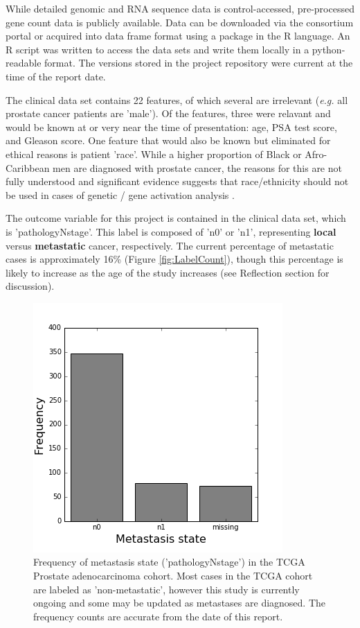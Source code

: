 \documentclass[final]{article}
\begin{document}
While detailed genomic and RNA sequence data is control-accessed, pre-processed
gene count data is publicly available.  Data can be downloaded via the
consortium  portal or acquired into data frame format using a package in the R
language.  An R script was written to access the data sets and write them locally
in a python-readable format.  The versions stored in the project repository were current at
the time of the report date.

The clinical data set contains 22 features, of which several are irrelevant
(\textit{e.g.} all prostate cancer patients are 'male').  Of the features, three were relavant and would be
known at or very near the time of presentation: age, PSA test score, and Gleason
score.  One feature that would also be known but eliminated for ethical reasons is
patient 'race'.  While a higher proportion of Black or Afro-Caribbean men are
diagnosed with prostate cancer, the reasons for this are not fully understood \cite{Shea08} and significant evidence suggests that
race/ethnicity should not be used in cases of genetic / gene activation analysis \cite{Yudel16}.

The outcome variable for this project is contained in the clinical data set,
which is 'pathologyNstage'.  This label is composed of 'n0' or 'n1',
representing \textbf{local} versus \textbf{metastatic} cancer, respectively.  The current
percentage of metastatic cases is approximately 16\% (Figure \ref{fig:LabelCount}), though this percentage is
likely to increase as the age of the study increases (see Reflection section for
discussion).

\begin{figure}
	\centering
	\includegraphics[scale=0.5]{LabelCount}
  \caption{Frequency of metastasis state ('pathologyNstage') in the TCGA Prostate adenocarcinoma cohort.\label{MetFreq}
    Most cases in the TCGA cohort are labeled as 'non-metastatic', however this study is currently ongoing and
  some may be updated as metastases are diagnosed.  The frequency counts are accurate from the
  date of this report.}
\end{figure}
\end{document}

